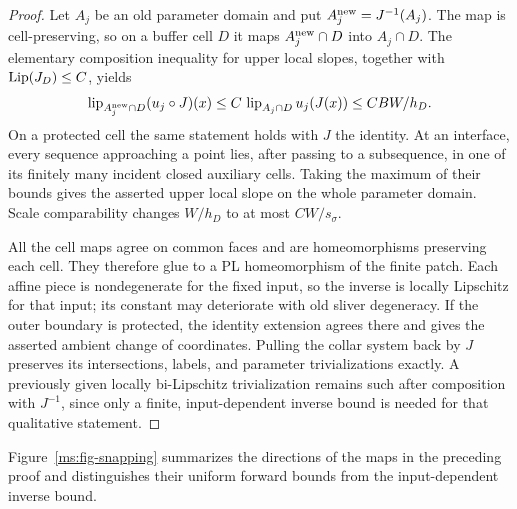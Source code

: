 \begin{proof}
Let $A_j$ be an old parameter domain and put
$A_j^{\rm new}=J^{-1}(A_j)$.  The map is cell-preserving, so on a
buffer cell $D$ it maps $A_j^{\rm new}\cap D$ into $A_j\cap D$.
The elementary composition inequality for upper local slopes,
together with $\operatorname{Lip}(J_D)\leq C$, yields
\[
 \operatorname{lip}_{A_j^{\rm new}\cap D}(u_j\circ J)(x)
 \leq C\,\operatorname{lip}_{A_j\cap D}u_j(J(x))
 \leq C B W/h_D.
\]
On a protected cell the same statement holds with $J$ the identity.
At an interface, every sequence approaching a point lies, after
passing to a subsequence, in one of its finitely many incident
closed auxiliary cells.  Taking the maximum of their bounds gives
the asserted upper local slope on the whole parameter domain.
Scale comparability changes $W/h_D$ to at most $C W/s_\sigma$.

All the cell maps agree on common faces and are homeomorphisms
preserving each cell.  They therefore glue to a PL homeomorphism
of the finite patch.  Each affine piece is nondegenerate for the
fixed input, so the inverse is locally Lipschitz for that input;
its constant may deteriorate with old sliver degeneracy.  If the
outer boundary is protected, the identity extension agrees there
and gives the asserted ambient change of coordinates.  Pulling
the collar system back by $J$ preserves its intersections, labels,
and parameter trivializations exactly.  A previously given
locally bi-Lipschitz trivialization remains such after composition
with $J^{-1}$, since only a finite, input-dependent inverse bound
is needed for that qualitative statement.
\end{proof}

Figure~\ref{ms:fig-snapping} summarizes the directions of the maps
in the preceding proof and distinguishes their uniform forward
bounds from the input-dependent inverse bound.

